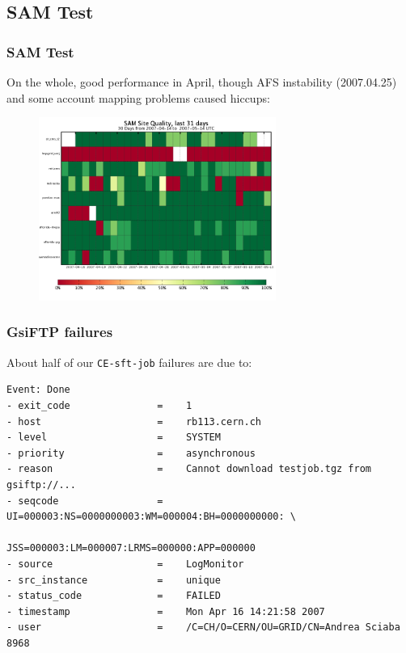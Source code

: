 \documentclass{beamer}
\begin{document}
\subsection{SAM Test}
\begin{frame}
\frametitle{SAM Test}
On the whole, good performance in April, though AFS instability (2007.04.25) 
and some account mapping problems caused hiccups:
\begin{figure}
    \includegraphics*[height=6cm]{Graphics/osg_sam_quality.png}
\end{figure}
\end{frame}

\begin{frame}[fragile]
\frametitle{GsiFTP failures}
About half of our {\tt CE-sft-job} failures are due to:
\scriptsize
\begin{verbatim}
Event: Done
- exit_code               =    1
- host                    =    rb113.cern.ch
- level                   =    SYSTEM
- priority                =    asynchronous
- reason                  =    Cannot download testjob.tgz from gsiftp://...
- seqcode                 =    UI=000003:NS=0000000003:WM=000004:BH=0000000000: \
                               JSS=000003:LM=000007:LRMS=000000:APP=000000
- source                  =    LogMonitor
- src_instance            =    unique
- status_code             =    FAILED
- timestamp               =    Mon Apr 16 14:21:58 2007
- user                    =    /C=CH/O=CERN/OU=GRID/CN=Andrea Sciaba 8968
\end{verbatim}
\end{frame}
\end{document}

